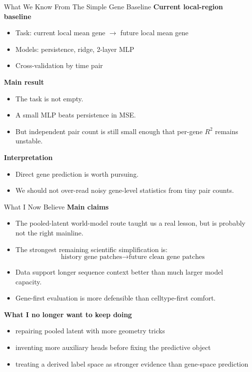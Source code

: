\documentclass[aspectratio=169,11pt]{beamer}
\begin{document}
\begin{frame}{What We Know From The Simple Gene Baseline}
\textbf{Current local-region baseline}
\begin{itemize}
    \item Task: current local mean gene \(\rightarrow\) future local mean gene
    \item Models: persistence, ridge, 2-layer MLP
    \item Cross-validation by time pair
\end{itemize}

\vspace{0.5em}
\textbf{Main result}
\begin{itemize}
    \item The task is not empty.
    \item A small MLP beats persistence in MSE.
    \item But independent pair count is still small enough that per-gene \(R^2\) remains unstable.
\end{itemize}

\vspace{0.5em}
\textbf{Interpretation}
\begin{itemize}
    \item Direct gene prediction is worth pursuing.
    \item We should not over-read noisy gene-level statistics from tiny pair counts.
\end{itemize}
\end{frame}

\begin{frame}{What I Now Believe}
\textbf{Main claims}
\begin{itemize}
    \item The pooled-latent world-model route taught us a real lesson, but is probably not the right mainline.
    \item The strongest remaining scientific simplification is:
    \[
    \text{history gene patches} \rightarrow \text{future clean gene patches}
    \]
    \item Data support longer sequence context better than much larger model capacity.
    \item Gene-first evaluation is more defensible than celltype-first comfort.
\end{itemize}

\vspace{0.5em}
\textbf{What I no longer want to keep doing}
\begin{itemize}
    \item repairing pooled latent with more geometry tricks
    \item inventing more auxiliary heads before fixing the predictive object
    \item treating a derived label space as stronger evidence than gene-space prediction
\end{itemize}
\end{frame}
\end{document}
